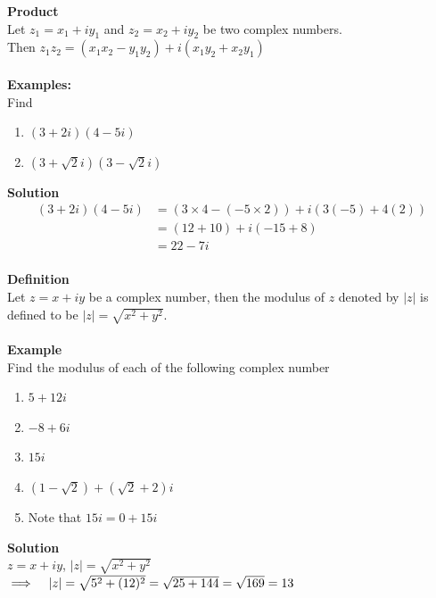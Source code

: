 \documentclass[11pt,a4paper]{article}
\begin{document}
\textbf{Product}\\
Let $z_1=x_1+iy_1$ and $z_2=x_2+iy_2$ be two complex numbers.\\ Then $z_1z_2=(x_1x_2-y_1y_2)+i(x_1y_2+x_2y_1)$\\\\

\textbf{Examples:}\\
Find
\begin{enumerate}
\item[(a).] $(3+2i)(4-5i)$
\item[(b).] $(3+\sqrt{2}i)(3-\sqrt{2}i)$\\
\end{enumerate}


\textbf{Solution}
\begin{align*}
(3+2i)(4-5i) &= (3\times 4-(-5\times 2))+i(3(-5)+4(2))\\
             &= (12+10)+i(-15+8)\\
             &= 22-7i\\
\end{align*}



\textbf{Definition}\\
Let $z=x+iy$ be a complex number, then the modulus of $z$ denoted by $|z|$ is defined to be $|z|=\sqrt{x^2+y^2}$.\\\\

\textbf{Example}\\
Find the modulus of each of the following complex number
\begin{enumerate}
\item[(a).] $5+12i$
\item[(b).] $-8+6i$
\item[(c).] $15i$
\item[(d).] $(1-\sqrt{2})+(\sqrt{2}+2)i$\\

\item[$\bullet$] Note that $15i=0+15i$\\
\end{enumerate}


\textbf{Solution}\\
$z=x+iy$, $|z|=\sqrt{x^2+y^2}$\\

$\implies \hspace{0.3cm} |z|=\sqrt{5^2+(12)^2}=\sqrt{25+144}=\sqrt{169}=13$\\\\
\end{document}
